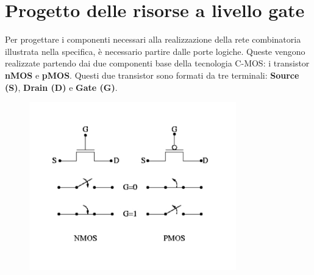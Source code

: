 \documentclass[10pt]{article}
\begin{document}
\section{Progetto delle risorse a livello gate}
Per progettare i componenti necessari alla realizzazione della rete combinatoria illustrata nella specifica, è necessario
partire dalle porte logiche. Queste vengono realizzate partendo dai due componenti base della tecnologia C-MOS: i transistor \textbf{nMOS} e \textbf{pMOS}.
Questi due transistor sono formati da tre terminali: \textbf{Source (S)}, \textbf{Drain (D)} e \textbf{Gate (G)}.

\begin{figure}[H]
    \centering
    \includegraphics[width=0.8\textwidth]{transistors}    
\end{figure}
\end{document}
